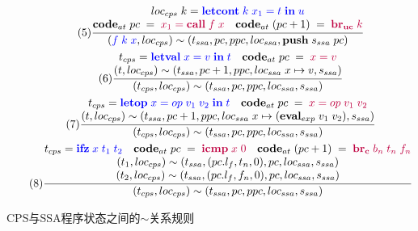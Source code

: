 \begin{figure}[htbp]
\begin{gather*}
        \tag{5} \displaystyle{\frac{\begin{matrix}
            loc_{cps}\; k = \textcolor{blue}{\mathbf{letcont}\; k\; x_1=t\; \mathbf{in}\; u}\\
            \mathbf{code}_{at}\; pc\; =\; \textcolor{purple}{x_1 = \mathbf{call}\; f\; x}\quad
            \mathbf{code}_{at}\; (pc+1)\; =\; \textcolor{purple}{\mathbf{br_{uc}}\; k} \end{matrix}}
            {(\textcolor{blue}{f\; k\; x},loc_{cps})\sim (t_{ssa},pc,ppc,loc_{ssa},\mathbf{push}\; s_{ssa}\; pc)}}  \\
        \tag{6} \displaystyle{\frac{\begin{matrix}
            t_{cps} = \textcolor{blue}{\mathbf{letval}\; x=v\; \mathbf{in}\; t} \quad
            \mathbf{code}_{at}\; pc\; =\; \textcolor{purple}{x = v} \\
            (t,loc_{cps})\sim (t_{ssa},pc+1,ppc,loc_{ssa}\; x\mapsto v,s_{ssa}) \end{matrix}}
            {(t_{cps},loc_{cps})\sim (t_{ssa},pc,ppc,loc_{ssa},s_{ssa})}}  \\
        \tag{7} \displaystyle{\frac{\begin{matrix}
            t_{cps} = \textcolor{blue}{\mathbf{letop}\; x=op\; v_1\; v_2\; \mathbf{in}\; t} \quad
            \mathbf{code}_{at}\; pc\; =\; \textcolor{purple}{x = op\; v_1\; v_2} \\
            (t,loc_{cps})\sim (t_{ssa},pc+1,ppc,loc_{ssa}\; x\mapsto (\mathbf{eval}_{exp}\; v_1\; v_2),s_{ssa}) \end{matrix}}
            {(t_{cps},loc_{cps})\sim (t_{ssa},pc,ppc,loc_{ssa},s_{ssa})}}  \\ 
        \tag{8} \displaystyle{\frac{\begin{matrix}
            t_{cps} = \textcolor{blue}{\mathbf{ifz}\; x\; t_1\; t_2} \quad
            \mathbf{code}_{at}\; pc\; =\; \textcolor{purple}{\mathbf{icmp}\; x\; 0} \quad
            \mathbf{code}_{at}\; (pc+1)\; =\; \textcolor{purple}{\mathbf{br_c}\; b_n\; t_n\; f_n} \\
            (t_1,loc_{cps})\sim (t_{ssa},(pc.l_f, t_n, 0),pc,loc_{ssa},s_{ssa}) \\
            (t_2,loc_{cps})\sim (t_{ssa},(pc.l_f, f_n, 0),pc,loc_{ssa},s_{ssa}) \end{matrix}}
            {(t_{cps},loc_{cps})\sim (t_{ssa},pc,ppc,loc_{ssa},s_{ssa})}}  \\          
    \end{gather*}
    \caption{CPS与SSA程序状态之间的$\sim$关系规则}\label{fig:simrelation}
\end{figure}

